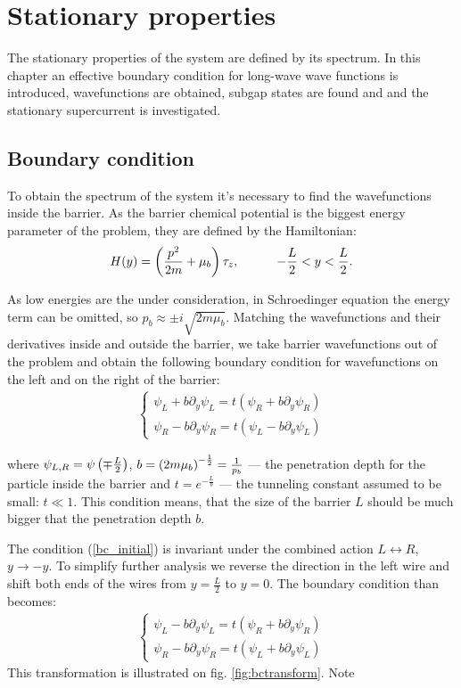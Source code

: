 \chapter{Stationary properties} 
\label{chap:stationary}
\label{chap:stationary_properties}
The stationary properties of the system are defined by its spectrum. In this chapter an effective boundary condition for long-wave wave functions is introduced, wavefunctions are obtained, subgap states are found and  and the stationary supercurrent is investigated.

\section{Boundary condition}

To obtain the spectrum of the system it's necessary to find the wavefunctions inside the barrier. As the barrier chemical potential  is the biggest energy parameter of the problem, they are defined by the Hamiltonian:
\begin{gather}
\label{barrier_Hamiltonian}
	H(y)
	=
	\left(
		\frac{p^2}{2m}
		+\mu_b
	\right)\tau_z,  ~~~~~~~~~-\frac{L}{2}<y<\frac{L}{2}.
\end{gather} 

As low energies are the under consideration, in Schroedinger equation the energy term can be omitted, so $ p_b\approx\pm i \sqrt{2m\mu_b} $. Matching the wavefunctions and their derivatives inside and outside the barrier, we take barrier wavefunctions out of the problem and obtain the following boundary condition for wavefunctions on the left and on the right of the barrier:
\begin{gather}
\label{bc_initial}
	\begin{cases}
	\psi_L + b\partial_y\psi_L=t(\psi_R + b\partial_y\psi_R) \\
	\psi_R - b\partial_y\psi_R=t(\psi_L - b\partial_y\psi_L)
	\end{cases}
\end{gather}

where $ \psi_{L,R}=\psi\left(\mp\frac{L}{2}\right) $, $ b=\left({2m\mu_b}\right)^{-\frac{1}{2}}=\frac{1}{p_b} $ --- the penetration depth for the particle inside the barrier and $ t = e^{-\frac{L}{b} }$ --- the tunneling constant assumed to be small: $ t\ll 1 $. This condition means, that the size of the barrier $ L $ should be  much bigger that the penetration depth $ b $.

The condition (\ref{bc_initial}) is invariant under the combined action $ L\leftrightarrow R $, $ y\to-y $. To simplify further analysis we reverse the direction in the left wire and shift both ends of the wires from $ y= \frac{L}{2} $ to $ y=0 $. The boundary condition than becomes:
\begin{gather}
\label{bc_transformed}
\begin{cases}
\psi_L - b\partial_y\psi_L=t(\psi_R + b\partial_y\psi_R) \\
\psi_R - b\partial_y\psi_R=t(\psi_L + b\partial_y\psi_L)
\end{cases}
\end{gather}
This transformation is illustrated on fig. \ref{fig:bctransform}. Note


